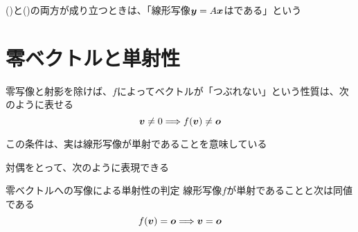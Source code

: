\documentclass[../../../topic_linear-algebra]{subfiles}
\begin{document}
()と()の両方が成り立つときは、「線形写像$\vb*{y} = A\vb*{x}$はである」という

\sectionline
\section{零ベクトルと単射性}

零写像と射影を除けば、$f$によってベクトルが「つぶれない」という性質は、次のように表せる
\begin{equation*}
  \vb*{v} \neq 0 \Longrightarrow f(\vb*{v}) \neq \vb*{o}
\end{equation*}


この条件は、実は線形写像が単射であることを意味している

対偶をとって、次のように表現できる

\begin{theorem}{零ベクトルへの写像による単射性の判定}\label{thm:injective-zero-test}
  線形写像$f$が単射であることと次は同値である
  \begin{equation*}
    f(\vb*{v}) = \vb*{o} \Longrightarrow \vb*{v} = \vb*{o}
  \end{equation*}
\end{theorem}
\end{document}
